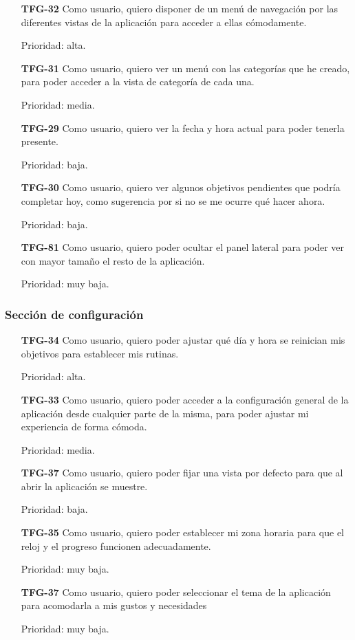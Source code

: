\documentclass[10pt, a4paper]{aqademic}
\begin{document}
\begin{itemize}[leftmargin=16mm]
	\item [\textbf{TFG-32}] Como usuario, quiero disponer de un menú de navegación por las diferentes vistas de la aplicación para acceder a ellas cómodamente.
	
	Prioridad: alta.
	
	\item [\textbf{TFG-31}] Como usuario, quiero ver un menú con las categorías que he creado, para poder acceder a la vista de categoría de cada una.
	
	Prioridad: media.
	
	\item [\textbf{TFG-29}] Como usuario, quiero ver la fecha y hora actual para poder tenerla presente.
	
	Prioridad: baja.
	
	\item [\textbf{TFG-30}] Como usuario, quiero ver algunos objetivos pendientes que podría completar hoy, como sugerencia por si no se me ocurre qué hacer ahora.
	
	Prioridad: baja.
	
	\item [\textbf{TFG-81}] Como usuario, quiero poder ocultar el panel lateral para poder ver con mayor tamaño el resto de la aplicación.
	
	Prioridad: muy baja.
\end{itemize}

\subsubsection*{Sección de configuración}

\begin{itemize}[leftmargin=16mm]
	\item [\textbf{TFG-34}] Como usuario, quiero poder ajustar qué día y hora se reinician mis objetivos para establecer mis rutinas.
	
	Prioridad: alta.
	
	\item [\textbf{TFG-33}] Como usuario, quiero poder acceder a la configuración general de la aplicación desde cualquier parte de la misma, para poder ajustar mi experiencia de forma cómoda.
	
	Prioridad: media.
	
	
	\item [\textbf{TFG-37}] Como usuario, quiero poder fijar una vista por defecto para que al abrir la aplicación se muestre.
	
	Prioridad: baja.
	
	\item [\textbf{TFG-35}] Como usuario, quiero poder establecer mi zona horaria para que el reloj y el progreso funcionen adecuadamente.

	Prioridad: muy baja.
	
	\item [\textbf{TFG-37}] Como usuario, quiero poder seleccionar el tema de la aplicación para acomodarla a mis gustos y necesidades 
	
	Prioridad: muy baja.
\end{itemize}
\end{document}
